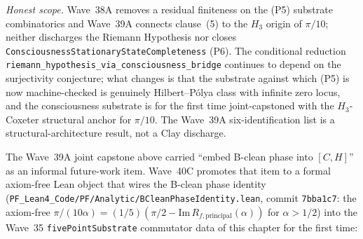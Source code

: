 \begin{remark}
\emph{Honest scope.} Wave~38A removes a residual finiteness on the (P5) substrate combinatorics and Wave~39A connects clause~(5) to the $H_3$ origin of $\pi/10$; neither discharges the Riemann Hypothesis nor closes \texttt{ConsciousnessStationaryStateCompleteness} (P6). The conditional reduction \texttt{riemann\_hypothesis\_via\_consciousness\_bridge} continues to depend on the surjectivity conjecture; what changes is that the substrate against which (P5) is now machine-checked is genuinely Hilbert--P\'olya class with infinite zero locus, and the consciousness substrate is for the first time joint-capstoned with the $H_3$-Coxeter structural anchor for $\pi/10$. The Wave~39A six-identification list is a structural-architecture result, not a Clay discharge.
\end{remark}

\begin{remark}\label{rem:consciousness-wave40-lean}
The Wave~39A joint capstone above carried ``embed B-clean phase into $[C, H]$'' as an informal future-work item. Wave~40C promotes that item to a formal axiom-free Lean object that wires the B-clean phase identity (\texttt{PF\_Lean4\_Code/PF/Analytic/BCleanPhaseIdentity.lean}, commit \texttt{7bba1c7}: the axiom-free $\pi/(10\alpha) = (1/5)(\pi/2 - \mathrm{Im}\, R_{f,\mathrm{principal}}(\alpha))$ for $\alpha > 1/2$) into the Wave~35 \texttt{fivePointSubstrate} commutator data of this chapter for the first time:
\begin{itemize}

\end{itemize}
\end{remark}
